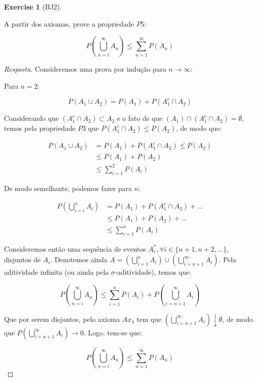 \documentclass[
]{article}
\theoremstyle{definition}
\theoremstyle{definition}
\theoremstyle{definition}
\newtheorem{exercise}{Exercise}[section]
\theoremstyle{definition}
\theoremstyle{remark}
\begin{document}
\begin{exercise}[BJ2]
\protect\hypertarget{exr:exbj2}{}\label{exr:exbj2}

A partir dos axiomas, prove a propriedade \(P5\):

\[
P\left(\bigcup_{n=i}^{\infty}A_{n}\right) \le \sum_{n=1}^{\infty}P(A_{n})
\]

\begin{proof}[Resposta]
Consideremos uma prova por indução para \(n \to \infty\):

Para \(n=2\):

\[
P(A_{1} \cup A_{2}) = P(A_{1}) + P(A_{1}^{c} \cap A_{2})
\]

Considerando que \((A_1^{c} \cap A_{2}) \subset A_{2}\) e o fato de que \((A_{1}) \cap (A_{1}^{c} \cap A_{2}) = \emptyset\), temos pela propriedade \(P3\) que \(P(A_1^{c} \cap A_{2}) \le P(A_{2})\), de modo que:

\begin{align*}
P(A_{1} \cup A_{2}) &= P(A_{1}) + P(A_{1}^{c} \cap A_{2}) \le P(A_{2}) \\
&\le P(A_{1}) + P(A_{2})\\
&\le \sum_{i=1}^{2}P(A_{i})
\end{align*}

De modo semelhante, podemos fazer para \(n\):

\begin{align*}
P\left(\bigcup_{i=i}^{n}A_{i}\right) &= P(A_{1}) + P(A_{1}^{c} \cap A_{2}) + \dots \\
&\le P(A_{1}) + P(A_{2}) + \dots\\
&\le \sum_{i=1}^{n}P(A_{i})
\end{align*}

Consideremos então uma sequência de eventos \(A_{i}^{*},\forall i \in \{n+1,n+2,\dots\}\), disjuntos de \(A_{i}\). Denotemos ainda \(A = \left(\bigcup_{i = 1}^{n}A_{i}\right) \cup \left(\bigcup_{i=n+1}^{\infty}A_{i}\right)\). Pela aditividade infinita (ou ainda pela \(\sigma\)-aditividade), temos que:

\[
P\left(\bigcup_{n=i}^{\infty}A_{n}\right) \le \sum_{i=1}^{n}P(A_{i}) + P\left(\bigcup_{i=n+1}^{\infty}A_{i}\right)
\]

Que por serem disjuntos, pelo axioma \(Ax_{4}\) tem que \(\left(\bigcup_{i=n+1}^{\infty}A_{i}\right)\downarrow \emptyset\), de modo que \(P\left(\bigcup_{i=n+1}^{\infty}A_{i}\right) \to 0\). Logo, tem-se que:

\[
P\left(\bigcup_{n=i}^{\infty}A_{n}\right) \le \sum_{n=1}^{\infty}P(A_{n})
\]
\end{proof}

\end{exercise}
\end{document}
